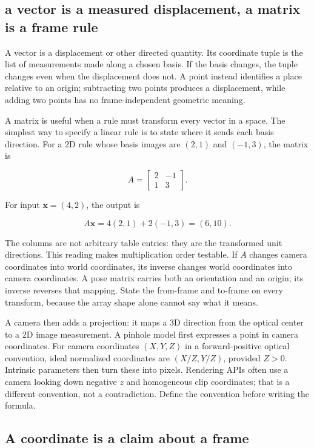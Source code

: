 \subsection{a vector is a measured displacement, a matrix is a frame rule}\label{02-foundations-ii-ch032-a-vector-is-a-measured-displacement-a-matrix-is-a-frame-rule}

A vector is a displacement or other directed quantity. Its coordinate tuple is the list of measurements made along a chosen basis. If the basis changes, the tuple changes even when the displacement does not. A point instead identifies a place relative to an origin; subtracting two points produces a displacement, while adding two points has no frame-independent geometric meaning.

A matrix is useful when a rule must transform every vector in a space. The simplest way to specify a linear rule is to state where it sends each basis direction. For a 2D rule whose basis images are \((2,1)\) and \((-1,3)\), the matrix is

\[
A=\begin{bmatrix}2&-1\\1&3\end{bmatrix}.
\]

For input \(\mathbf{x}=(4,2)\), the output is

\[
A\mathbf{x}=4(2,1)+2(-1,3)=(6,10).
\]

The columns are not arbitrary table entries: they are the transformed unit directions. This reading makes multiplication order testable. If \(A\) changes camera coordinates into world coordinates, its inverse changes world coordinates into camera coordinates. A pose matrix carries both an orientation and an origin; its inverse reverses that mapping. State the from-frame and to-frame on every transform, because the array shape alone cannot say what it means.

A camera then adds a projection: it maps a 3D direction from the optical center to a 2D image measurement. A pinhole model first expresses a point in camera coordinates. For camera coordinates \((X,Y,Z)\) in a forward-positive optical convention, ideal normalized coordinates are \((X/Z,Y/Z)\), provided \(Z>0\). Intrinsic parameters then turn these into pixels. Rendering APIs often use a camera looking down negative \(z\) and homogeneous clip coordinates; that is a different convention, not a contradiction. Define the convention before writing the formula.

\subsection{A coordinate is a claim about a frame}\label{02-foundations-ii-ch032-a-coordinate-is-a-claim-about-a-frame}

